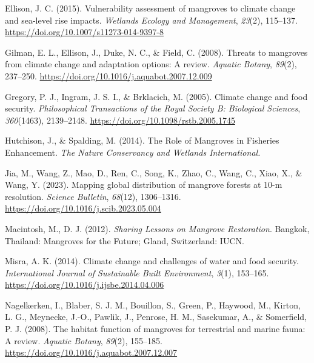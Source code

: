 \documentclass[
  12pt,
]{article}
\newlength{\cslhangindent}
\newlength{\cslentryspacingunit} %
\newenvironment{CSLReferences}[2] %
 {%
  \setlength{\parindent}{0pt}
  \ifodd #1
  \let\oldpar\par
  \def\par{\hangindent=\cslhangindent\oldpar}
  \fi
  \setlength{\parskip}{#2\cslentryspacingunit}
 }%
 {}
\begin{document}
\begin{CSLReferences}{1}{2}
\leavevmode{}%
Ellison, J. C. (2015). Vulnerability assessment of mangroves to climate change and sea-level rise impacts. \emph{Wetlands Ecology and Management}, \emph{23}(2), 115--137. \url{https://doi.org/10.1007/s11273-014-9397-8}

\leavevmode{}%
Gilman, E. L., Ellison, J., Duke, N. C., \& Field, C. (2008). Threats to mangroves from climate change and adaptation options: {A} review. \emph{Aquatic Botany}, \emph{89}(2), 237--250. \url{https://doi.org/10.1016/j.aquabot.2007.12.009}

\leavevmode{}%
Gregory, P. J., Ingram, J. S. I., \& Brklacich, M. (2005). Climate change and food security. \emph{Philosophical Transactions of the Royal Society B: Biological Sciences}, \emph{360}(1463), 2139--2148. \url{https://doi.org/10.1098/rstb.2005.1745}

\leavevmode{}%
Hutchison, J., \& Spalding, M. (2014). The {Role} of {Mangroves} in {Fisheries Enhancement}. \emph{The Nature Conservancy and Wetlands International.}

\leavevmode{}%
Jia, M., Wang, Z., Mao, D., Ren, C., Song, K., Zhao, C., Wang, C., Xiao, X., \& Wang, Y. (2023). Mapping global distribution of mangrove forests at 10-m resolution. \emph{Science Bulletin}, \emph{68}(12), 1306--1316. \url{https://doi.org/10.1016/j.scib.2023.05.004}

\leavevmode{}%
Macintosh, M., D. J. (2012). \emph{{Sharing Lessons} on {Mangrove Restoration}}. Bangkok, Thailand: Mangroves for the Future; Gland, Switzerland: IUCN.

\leavevmode{}%
Misra, A. K. (2014). Climate change and challenges of water and food security. \emph{International Journal of Sustainable Built Environment}, \emph{3}(1), 153--165. \url{https://doi.org/10.1016/j.ijsbe.2014.04.006}

\leavevmode{}%
Nagelkerken, I., Blaber, S. J. M., Bouillon, S., Green, P., Haywood, M., Kirton, L. G., Meynecke, J.-O., Pawlik, J., Penrose, H. M., Sasekumar, A., \& Somerfield, P. J. (2008). The habitat function of mangroves for terrestrial and marine fauna: {A} review. \emph{Aquatic Botany}, \emph{89}(2), 155--185. \url{https://doi.org/10.1016/j.aquabot.2007.12.007}


\end{CSLReferences}
\end{document}
